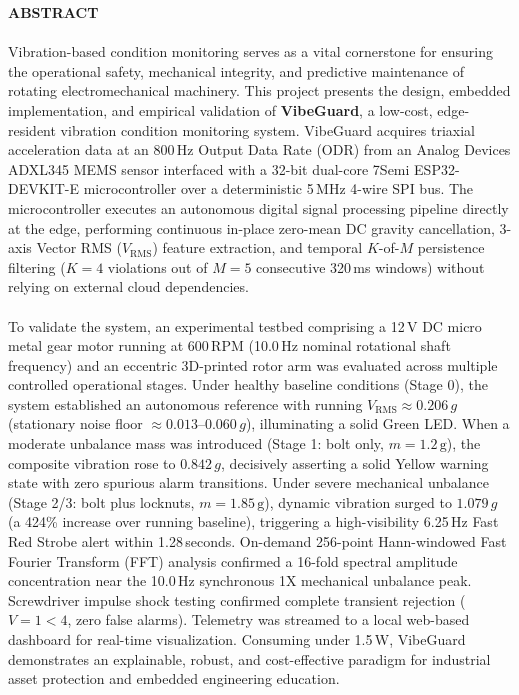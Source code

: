 \begin{center}
\textbf{\fontsize{16}{28}\selectfont ABSTRACT}
\end{center}
\vspace{0.6em}
\fontsize{12}{22}\selectfont

\paragraph*{}Vibration-based condition monitoring serves as a vital cornerstone for ensuring the operational safety, mechanical integrity, and predictive maintenance of rotating electromechanical machinery. This project presents the design, embedded implementation, and empirical validation of \textbf{VibeGuard}, a low-cost, edge-resident vibration condition monitoring system. VibeGuard acquires triaxial acceleration data at an 800\,Hz Output Data Rate (ODR) from an Analog Devices ADXL345 MEMS sensor interfaced with a 32-bit dual-core 7Semi ESP32-DEVKIT-E microcontroller over a deterministic 5\,MHz 4-wire SPI bus. The microcontroller executes an autonomous digital signal processing pipeline directly at the edge, performing continuous in-place zero-mean DC gravity cancellation, 3-axis Vector RMS ($V_{\text{RMS}}$) feature extraction, and temporal $K$-of-$M$ persistence filtering ($K=4$ violations out of $M=5$ consecutive 320\,ms windows) without relying on external cloud dependencies.

\paragraph*{}To validate the system, an experimental testbed comprising a 12\,V DC micro metal gear motor running at 600\,RPM (10.0\,Hz nominal rotational shaft frequency) and an eccentric 3D-printed rotor arm was evaluated across multiple controlled operational stages. Under healthy baseline conditions (Stage 0), the system established an autonomous reference with running $V_{\text{RMS}} \approx 0.206\,g$ (stationary noise floor $\approx 0.013$--$0.060\,g$), illuminating a solid Green LED. When a moderate unbalance mass was introduced (Stage 1: bolt only, $m = 1.2\,\text{g}$), the composite vibration rose to $0.842\,g$, decisively asserting a solid Yellow warning state with zero spurious alarm transitions. Under severe mechanical unbalance (Stage 2/3: bolt plus locknuts, $m = 1.85\,\text{g}$), dynamic vibration surged to $1.079\,g$ (a 424\% increase over running baseline), triggering a high-visibility 6.25\,Hz Fast Red Strobe alert within 1.28\,seconds. On-demand 256-point Hann-windowed Fast Fourier Transform (FFT) analysis confirmed a 16-fold spectral amplitude concentration near the 10.0\,Hz synchronous 1X mechanical unbalance peak. Screwdriver impulse shock testing confirmed complete transient rejection ($V = 1 < 4$, zero false alarms). Telemetry was streamed to a local web-based dashboard for real-time visualization. Consuming under 1.5\,W, VibeGuard demonstrates an explainable, robust, and cost-effective paradigm for industrial asset protection and embedded engineering education.
\clearpage

